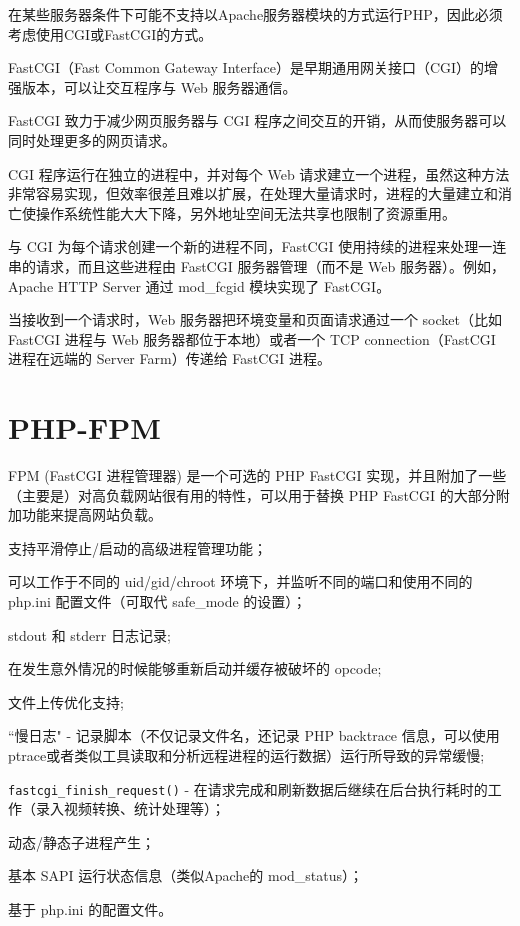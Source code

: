 在某些服务器条件下可能不支持以Apache服务器模块的方式运行PHP，因此必须考虑使用CGI或FastCGI的方式。


FastCGI（Fast Common Gateway Interface）是早期通用网关接口（CGI）的增强版本，可以让交互程序与 Web 服务器通信。

FastCGI 致力于减少网页服务器与 CGI 程序之间交互的开销，从而使服务器可以同时处理更多的网页请求。

CGI 程序运行在独立的进程中，并对每个 Web 请求建立一个进程，虽然这种方法非常容易实现，但效率很差且难以扩展，在处理大量请求时，进程的大量建立和消亡使操作系统性能大大下降，另外地址空间无法共享也限制了资源重用。

与 CGI 为每个请求创建一个新的进程不同，FastCGI 使用持续的进程来处理一连串的请求，而且这些进程由 FastCGI 服务器管理（而不是 Web 服务器）。例如，Apache HTTP Server 通过 mod\_fcgid 模块实现了 FastCGI。

当接收到一个请求时，Web 服务器把环境变量和页面请求通过一个 socket（比如FastCGI 进程与 Web 服务器都位于本地）或者一个 TCP connection（FastCGI 进程在远端的 Server Farm）传递给 FastCGI 进程。

\section{PHP-FPM}

FPM (FastCGI 进程管理器) 是一个可选的 PHP FastCGI 实现，并且附加了一些（主要是）对高负载网站很有用的特性，可以用于替换 PHP FastCGI 的大部分附加功能来提高网站负载。

\begin{compactitem}
\item 支持平滑停止/启动的高级进程管理功能；

\item 可以工作于不同的 uid/gid/chroot 环境下，并监听不同的端口和使用不同的 php.ini 配置文件（可取代 safe\_mode 的设置）；

\item stdout 和 stderr 日志记录;

\item 在发生意外情况的时候能够重新启动并缓存被破坏的 opcode;

\item 文件上传优化支持;

\item ``慢日志" - 记录脚本（不仅记录文件名，还记录 PHP backtrace 信息，可以使用 ptrace或者类似工具读取和分析远程进程的运行数据）运行所导致的异常缓慢;

\item \texttt{fastcgi\_finish\_request()} - 在请求完成和刷新数据后继续在后台执行耗时的工作（录入视频转换、统计处理等）；

\item 动态/静态子进程产生；

\item 基本 SAPI 运行状态信息（类似Apache的 mod\_status）；

\item 基于 php.ini 的配置文件。

\end{compactitem}


